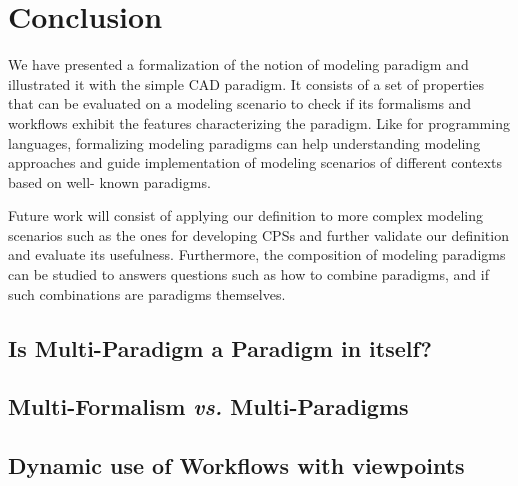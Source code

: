 \section{Conclusion}
\label{sec:Discussions}
We have presented a formalization of the notion of modeling paradigm and illustrated it with the simple CAD paradigm. It consists of a set of properties that can be evaluated on a modeling scenario to check if its formalisms and workflows exhibit the features characterizing the paradigm. Like for programming languages, formalizing modeling paradigms can help understanding modeling approaches and guide implementation of modeling scenarios of different contexts based on well- known paradigms.

Future work will consist of applying our definition to more complex modeling scenarios such as the ones for developing CPSs and further validate our definition and evaluate its usefulness. Furthermore, the composition of modeling paradigms can be studied to answers questions such as how to combine paradigms, and if such combinations are paradigms themselves.



\subsection{Is Multi-Paradigm a Paradigm in itself?}
\label{sec:Discussion-Multiparadigm}

\subsection{Multi-Formalism \emph{vs.} Multi-Paradigms}
\label{sec:Discussion-MFvsMP}

\subsection{Dynamic use of Workflows with viewpoints}
\label{sec:Discussion-Dynamic}